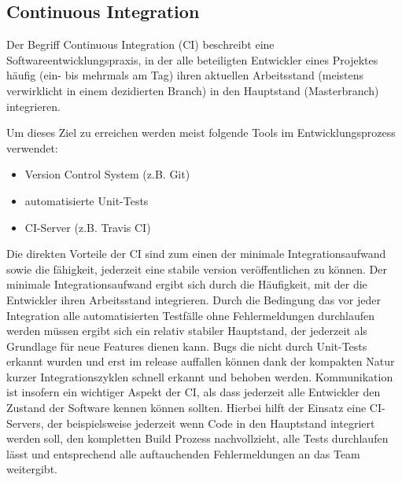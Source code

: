 \subsection{Continuous Integration}
Der Begriff Continuous Integration (CI) beschreibt eine Softwareentwicklungspraxis,
in der alle beteiligten Entwickler eines Projektes häufig (ein- bis mehrmals am Tag) ihren aktuellen
Arbeitsstand (meistens verwirklicht in einem dezidierten Branch) in den Hauptstand
(Masterbranch) integrieren.

Um dieses Ziel zu erreichen werden meist folgende Tools im Entwicklungsprozess 
verwendet:

\begin{itemize}
	\item Version Control System (z.B. Git)
	\item automatisierte Unit-Tests
	\item CI-Server (z.B. Travis CI)
\end{itemize}

Die direkten Vorteile der CI sind zum einen der minimale Integrationsaufwand sowie die fähigkeit, 
jederzeit eine stabile version veröffentlichen zu können.
Der minimale Integrationsaufwand ergibt sich durch die Häufigkeit,
mit der die Entwickler ihren Arbeitsstand integrieren. Durch die
Bedingung das vor jeder Integration alle automatisierten Testfälle ohne Fehlermeldungen durchlaufen
werden müssen ergibt sich ein relativ stabiler Hauptstand, der jederzeit als Grundlage für neue Features dienen kann.
Bugs die nicht durch Unit-Tests erkannt wurden und erst im release auffallen können dank der kompakten Natur kurzer
Integrationszyklen schnell erkannt und behoben werden.
Kommunikation ist insofern ein wichtiger Aspekt der CI, als dass jederzeit alle Entwickler den Zustand der Software
kennen können sollten. Hierbei hilft der Einsatz eine CI-Servers, der beispielsweise jederzeit wenn Code in den Hauptstand
integriert werden soll, den kompletten Build Prozess nachvollzieht, alle Tests durchlaufen lässt und entsprechend alle
auftauchenden Fehlermeldungen an das Team weitergibt.
\cite{ciwiki}